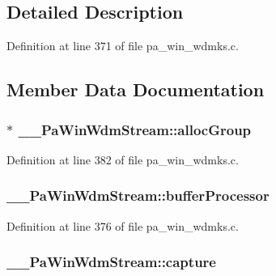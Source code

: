 \subsection{Detailed Description}


Definition at line 371 of file pa\+\_\+win\+\_\+wdmks.\+c.



\subsection{Member Data Documentation}
\subsubsection[{\texorpdfstring{alloc\+Group}{allocGroup}}]{$\ast$ \+\_\+\+\_\+\+Pa\+Win\+Wdm\+Stream\+::alloc\+Group}\hypertarget{struct_____pa_win_wdm_stream_a4dd31c3219fcd2e7cfd39dbf2006d08d}{}\label{struct_____pa_win_wdm_stream_a4dd31c3219fcd2e7cfd39dbf2006d08d}


Definition at line 382 of file pa\+\_\+win\+\_\+wdmks.\+c.

\subsubsection[{\texorpdfstring{buffer\+Processor}{bufferProcessor}}]{ \+\_\+\+\_\+\+Pa\+Win\+Wdm\+Stream\+::buffer\+Processor}\hypertarget{struct_____pa_win_wdm_stream_a2c900cef33bbe8ae112f0de607c61335}{}\label{struct_____pa_win_wdm_stream_a2c900cef33bbe8ae112f0de607c61335}


Definition at line 376 of file pa\+\_\+win\+\_\+wdmks.\+c.

\subsubsection[{\texorpdfstring{capture}{capture}}]{ \+\_\+\+\_\+\+Pa\+Win\+Wdm\+Stream\+::capture}\hypertarget{struct_____pa_win_wdm_stream_a31e13c53819af64975bdc06cdc8a164d}{}\label{struct_____pa_win_wdm_stream_a31e13c53819af64975bdc06cdc8a164d}


